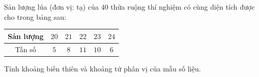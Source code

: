\begin{ex}
Sản lượng lúa (đơn vị: tạ) của $40$ thửa ruộng thí nghiệm có cùng diện tích được cho trong bảng sau:
\begin{center}
\begin{tabular}{|c|c|c|c|c|c|}\hline
Sản lượng & $20$ & $21$ & $22$ & $23$ & $24$\\\hline
Tần số & $5$ & $8$ & $11$ & $10$ & $6$\\\hline
\end{tabular}
\end{center}
Tính khoảng biến thiên và khoảng tứ phân vị của mẫu số liệu.
\end{ex}

